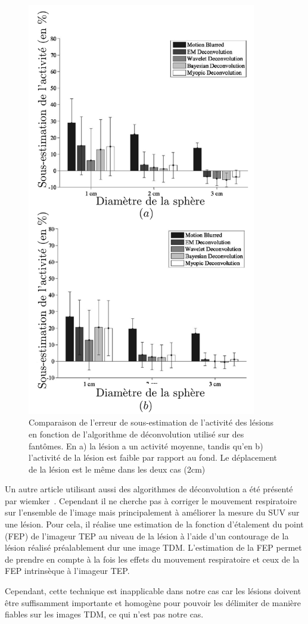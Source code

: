 \begin{figure}[h!]
	\begin{center}
		\includegraphics[width=10cm]{images/performanceDeconvolution}
	\end{center}
	\caption{Comparaison de l'erreur de sous-estimation de l'activité des lésions en fonction de l'algorithme de déconvolution utilisé sur des fantômes. En a) la lésion a un activité moyenne, tandis qu'en b) l'activité de la lésion est faible par rapport au fond. Le déplacement de la lésion est le même dans les deux cas (2cm)} 
	\label{fig:performanceDeconvolution}
\end{figure}


Un autre article utilisant aussi des algorithmes de déconvolution a été présenté par wiemker~\cite{wiemker2008combined}. Cependant il ne cherche pas à corriger le mouvement respiratoire sur l'ensemble de l'image mais principalement à améliorer la mesure du SUV sur une lésion. Pour cela, il réalise une estimation de la fonction d'étalement du point (FEP) de l'imageur TEP au niveau de la lésion à l'aide d'un contourage de la lésion réalisé préalablement dur une image TDM. L'estimation de la FEP permet de prendre en compte à la fois les effets du mouvement respiratoire et ceux de la FEP intrinsèque à l'imageur TEP. 

Cependant, cette technique est inapplicable dans notre cas car les lésions doivent être suffisamment importante et homogène pour pouvoir les délimiter de manière fiables sur les images TDM, ce qui n'est pas notre cas.
